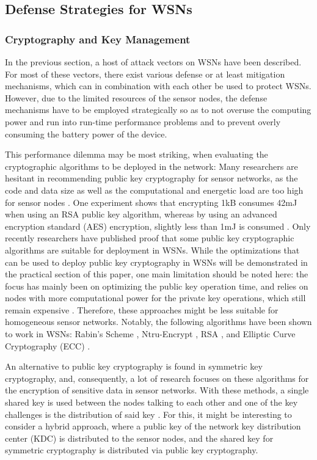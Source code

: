 \documentclass[12pt,a4paper,twoside]{report}
\begin{document}
\subsection{Defense Strategies for WSNs}
\subsubsection{Cryptography and Key Management}
In the previous section, a host of attack vectors on WSNs have been described. For most of these vectors, there exist various defense or at least mitigation mechanisms, which can in combination with each other be used to protect WSNs. However, due to the limited resources of the sensor nodes,  the defense mechanisms have to be employed strategically so as to not overuse the computing power and run into run-time performance problems and to prevent overly consuming the battery power of the device.\par
This performance dilemma may be most striking, when evaluating the cryptographic algorithms to be deployed in the network: Many researchers are hesitant in recommending public key cryptography for sensor networks, as the code and data size as well as the computational and energetic load are too high for sensor nodes \cite{sen:2009}. One experiment shows that encrypting 1kB consumes 42mJ when using an RSA public key  algorithm, whereas by using an advanced encryption standard (AES) encryption, slightly less than 1mJ is consumed \cite{sen:2009}. Only recently researchers have published proof that some public key cryptographic algorithms are suitable for deployment in WSNs. While the optimizations that can be used to deploy public key cryptography in WSNs will be demonstrated in the practical section of this paper, one main limitation should be noted here: the focus has mainly been on optimizing the public key operation time, and relies on nodes with more computational power for the private key operations, which still remain expensive \cite{sen:2009}. Therefore, these approaches might be less suitable for homogeneous sensor networks. Notably, the following algorithms have been shown to work in WSNs: Rabin's Scheme \cite{rabin:1979}, Ntru-Encrypt \cite{hoffstein;etal:1998}, RSA \cite{RSA:1983}, and Elliptic Curve Cryptography (ECC)\cite{miller:1986} \cite{kobiltz:1987}.\par
An alternative to public key cryptography is found in symmetric key cryptography, and, consequently, a lot of research focuses on these algorithms for the encryption of sensitive data in sensor networks. With these methods, a single shared key is used between the nodes talking to each other and one of the key challenges is the distribution of said key \cite{sen:2009}. For this, it might be interesting to consider a hybrid approach, where a public key of the network key distribution center (KDC) is distributed to the sensor nodes, and the shared key for symmetric cryptography is distributed via public key cryptography.\par
\end{document}
